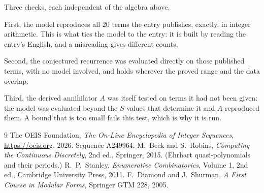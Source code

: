 \documentclass[11pt,a4paper]{article}
\theoremstyle{plain}
\theoremstyle{definition}
\begin{document}
Three checks, each independent of the algebra above.

First, the model reproduces all $20$ terms the entry publishes, exactly, in integer
arithmetic. This is what ties the model to the entry: it is built by reading the entry's
English, and a misreading gives different counts.

Second, the conjectured recurrence was evaluated directly on those published terms, with no
model involved, and holds wherever the proved range and the data overlap.

Third, the derived annihilator $A$ was itself tested on terms it had not been given: the model
was evaluated beyond the $S$ values that determine it and $A$ reproduced them. A bound that is
too small fails this test, which is why it is run.

\begin{thebibliography}{9}
 The OEIS Foundation, \emph{The On-Line Encyclopedia of Integer
Sequences}, \url{https://oeis.org}, 2026. Sequence A249964.
 M.~Beck and S.~Robins, \emph{Computing the Continuous Discretely},
2nd ed., Springer, 2015. (Ehrhart quasi-polynomials and their periods.)
 R.~P.~Stanley, \emph{Enumerative Combinatorics}, Volume 1, 2nd ed.,
Cambridge University Press, 2011.
 F.~Diamond and J.~Shurman, \emph{A First Course in Modular Forms},
Springer GTM 228, 2005.
\end{thebibliography}
\end{document}
